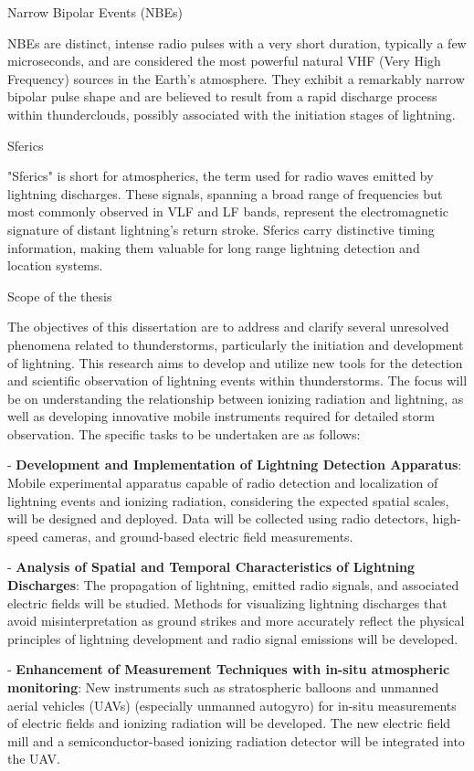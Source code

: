 \subsec Narrow Bipolar Events (NBEs)

NBEs are distinct, intense radio pulses with a very short duration, typically a few microseconds, and are considered the most powerful natural VHF (Very High Frequency) sources in the Earth's atmosphere. They exhibit a remarkably narrow bipolar pulse shape and are believed to result from a rapid discharge process within thunderclouds, possibly associated with the initiation stages of lightning.

\subsec Sferics

"Sferics" is short for atmospherics, the term used for radio waves emitted by lightning discharges. These signals, spanning a broad range of frequencies but most commonly observed in VLF and LF bands, represent the electromagnetic signature of distant lightning's return stroke. Sferics carry distinctive timing information, making them valuable for long range lightning detection and location systems.

\sec Scope of the thesis

The objectives of this dissertation are to address and clarify several unresolved phenomena related to thunderstorms, particularly the initiation and development of lightning. This research aims to develop and utilize new tools for the detection and scientific observation of lightning events within thunderstorms. The focus will be on understanding the relationship between ionizing radiation and lightning, as well as developing innovative mobile instruments required for detailed storm observation. The specific tasks to be undertaken are as follows:

\begitems
\item - {\bf Development and Implementation of Lightning Detection Apparatus}: Mobile experimental apparatus capable of radio detection and localization of lightning events and ionizing radiation, considering the expected spatial scales, will be designed and deployed. Data will be collected using radio detectors, high-speed cameras, and ground-based electric field measurements.
\item - {\bf Analysis of Spatial and Temporal Characteristics of Lightning Discharges}: The propagation of lightning, emitted radio signals, and associated electric fields will be studied. Methods for visualizing lightning discharges that avoid misinterpretation as ground strikes and more accurately reflect the physical principles of lightning development and radio signal emissions will be developed.
\item - {\bf Enhancement of Measurement Techniques with in-situ atmospheric monitoring}: New instruments such as stratospheric balloons and unmanned aerial vehicles (UAVs) (especially unmanned autogyro) for in-situ measurements of electric fields and ionizing radiation will be developed. The new electric field mill and a semiconductor-based ionizing radiation detector will be integrated into the UAV.
\enditems

